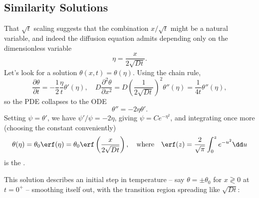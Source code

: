 \subsection{Similarity Solutions}

That $\sqrt{t}$ scaling suggests that the combination $x/\sqrt{t}$ might be a natural variable, and indeed the diffusion equation admits  depending only on the dimensionless variable
$$
\eta = \frac{x}{2 \sqrt{D t}}.
$$
Let's look for a solution $\theta(x, t) = \theta(\eta)$. Using the chain rule,
$$
\frac{\partial \theta}{\partial t} = -\frac{1}{2}\frac{\eta}{t} \theta'(\eta), \quad
D \frac{\partial^2 \theta}{\partial x^2} = D \left(\frac{1}{2\sqrt{Dt}}\right)^2 \theta''(\eta) = \frac{1}{4t}\theta''(\eta),
$$
so the PDE collapses to the ODE
$$
\theta'' = -2 \eta \theta'.
$$
Setting $\psi = \theta'$, we have $\psi'/\psi = -2\eta$, giving $\psi = C e^{-\eta^2}$, and integrating once more (choosing the constant conveniently)
$$
\theta(\eta) = \theta_0 \erf(\eta) = \theta_0 \erf\left(\frac{x}{2 \sqrt{Dt}}\right), \quad \text{where} \quad \erf(z) = \frac{2}{\sqrt{\pi}} \int_0^z e^{-u^2} \dd u
$$
is the .

This solution describes an initial step in temperature -- say $\theta = \pm \theta_0$ for $x \gtrless 0$ at $t = 0^+$ -- smoothing itself out, with the transition region spreading like $\sqrt{Dt}$:

